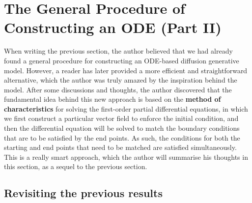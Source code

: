 \section{The General Procedure of Constructing an ODE (Part II)}
\label{sect_15}

When writing the previous section, the author believed that we had already found a general procedure for constructing an ODE-based diffusion generative model. However, a reader has later provided a more efficient and straightforward alternative, which the author  was truly amazed by the inspiration behind the model. After some  discussions and thoughts, the author discovered that the fundamental idea behind this new approach is based on the \textbf{method of characteristics} for solving the first-order partial differential equations, in which we first construct a particular vector field to enforce the initial condition, and then the differential equation will be solved to match the boundary conditions that are to be satisfied by the end points. As such,  the conditions for both the starting and end points that need to be matched are satisfied simultaneously. This is a really smart approach, which the author will summarise his thoughts in this section, as a sequel to the previous section.

\subsection{Revisiting the previous results}

